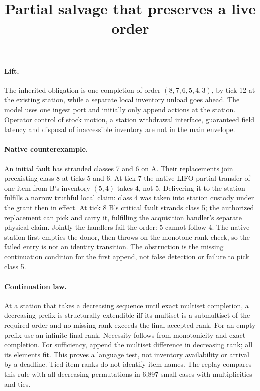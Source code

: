 \documentclass{article}
\begin{document}
\title{Partial salvage that preserves a live order}
\maketitle
\paragraph{Lift.}
The inherited obligation is one completion of order \((8,7,6,5,4,3)\),
by tick 12 at the existing station, while a separate local inventory
unload goes ahead. The model uses one ingest port and initially only
append actions at the station. Operator control of stock motion, a
station withdrawal interface, guaranteed field latency and
disposal of inaccessible inventory are not in the main envelope.

\paragraph{Native counterexample.}
An initial fault has stranded classes 7 and 6 on A. Their replacements
join preexisting class 8 at ticks 5 and 6. At tick 7 the native LIFO
partial transfer of one item from B's inventory \((5,4)\) takes 4,
not 5. Delivering it to the station fulfills a narrow truthful local
claim: class 4 was taken into station custody under the grant then in
effect. At tick 8 B's critical fault strands class 5; the authorized
replacement can pick and carry it, fulfilling the acquisition handler's
separate physical claim. Jointly the handlers fail the order: 5 cannot
follow 4. The native station first empties the donor, then throws on
the monotone-rank check, so the failed entry is not an identity
transition. The obstruction is the missing continuation condition for
the first append, not false detection or failure to pick class 5.

\paragraph{Continuation law.}
At a station that takes a decreasing sequence until exact multiset
completion, a decreasing prefix is structurally extendible iff its
multiset is a submultiset of the required order and no missing rank
exceeds the final accepted rank. For an empty prefix use an infinite
final rank. Necessity follows from monotonicity and exact completion.
For sufficiency, append the multiset difference in decreasing rank;
all its elements fit. This proves a language test, not inventory
availability or arrival by a deadline. Tied item ranks do not
identify item names. The replay compares this rule with all decreasing
permutations in 6,897 small cases with multiplicities and ties.
\end{document}
